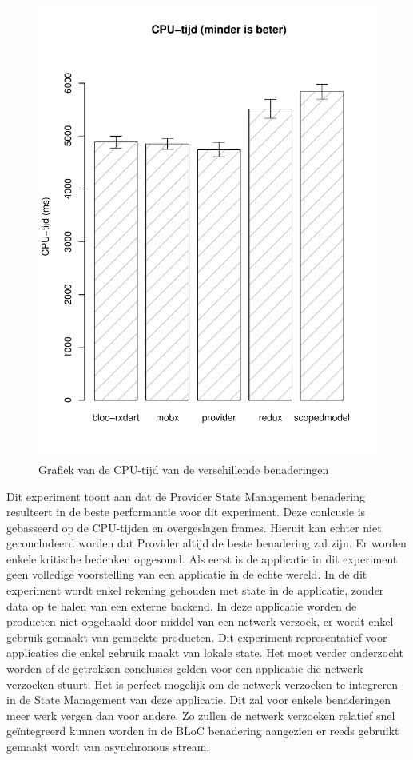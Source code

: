 \begin{figure}[H]
    \centering
    \includegraphics[width=0.8\linewidth]{img/experiment/cpu_time.pdf}
    \caption{Grafiek van de CPU-tijd van de verschillende benaderingen}
    \label{fig:graph-cpu-time}
\end{figure}
Dit experiment toont aan dat de Provider State Management benadering resulteert in de beste performantie voor dit experiment. Deze conlcusie is gebasseerd op de CPU-tijden en overgeslagen frames. Hieruit kan echter niet geconcludeerd worden dat Provider altijd de beste benadering zal zijn. Er worden enkele kritische bedenken opgesomd. \newline \newline
Als eerst is de applicatie in dit experiment geen volledige voorstelling van een applicatie in de echte wereld. In de dit experiment wordt enkel rekening gehouden met state in de applicatie, zonder data op te halen van een externe backend. In deze applicatie worden de producten niet opgehaald door middel van een netwerk verzoek, er wordt enkel gebruik gemaakt van gemockte producten. Dit experiment representatief voor applicaties die enkel gebruik maakt van lokale state. Het moet verder onderzocht worden of de getrokken conclusies gelden voor een applicatie die netwerk verzoeken stuurt. \newline
Het is perfect mogelijk om de netwerk verzoeken te integreren in de State Management van deze applicatie. Dit zal voor enkele benaderingen meer werk vergen dan voor andere. Zo zullen de netwerk verzoeken relatief snel geïntegreerd kunnen worden in de BLoC benadering aangezien er reeds gebruikt gemaakt wordt van asynchronous stream. \newline 

